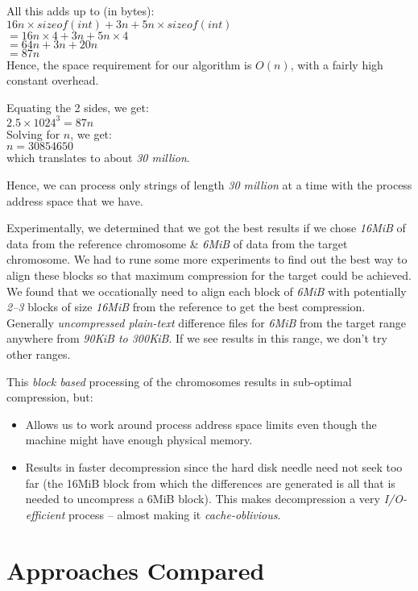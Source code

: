 \documentclass[11pt]{article}
\begin{document}
All this adds up to (in bytes):\\
$16n \times sizeof(int) + 3n + 5n \times sizeof(int)$\\
$= 16n \times 4 + 3n + 5n \times 4$\\
$= 64n + 3n + 20n$\\
$= 87n$\\

Hence, the space requirement for our algorithm is $O(n)$, with a
fairly high constant overhead.

Equating the 2 sides, we get:\\
$2.5 \times 1024^3 = 87n$\\
Solving for $n$, we get:\\
$n = 30854650$\\
which translates to about \textit{30 million}.

Hence, we can process only strings of length \textit{30 million} at a
time with the process address space that we have.

Experimentally, we determined that we got the best results if we chose
\textit{16MiB} of data from the reference chromosome \& \textit{6MiB} of
data from the target chromosome. We had to rune some more experiments
to find out the best way to align these blocks so that maximum
compression for the target could be achieved. We found that we
occationally need to align each block of \textit{6MiB} with
potentially \textit{2--3} blocks of size \textit{16MiB} from the
reference to get the best compression. Generally \textit{uncompressed
  plain-text} difference files for \textit{6MiB} from the target range
anywhere from {\textit{90KiB to 300KiB}}. If we see results in this
range, we don't try other ranges.

This \textit{block based} processing of the chromosomes results in
sub-optimal compression, but:
\begin{itemize}
\item Allows us to work around process address space limits even
  though the machine might have enough physical memory.
\item Results in faster decompression since the hard disk needle need
  not seek too far (the 16MiB block from which the differences are
  generated is all that is needed to uncompress a 6MiB block). This
  makes decompression a very \textit{I/O-efficient} process -- almost
  making it \textit{cache-oblivious}.
\end{itemize}

\section{Approaches Compared}
\end{document}
